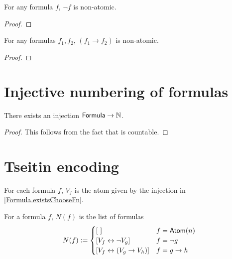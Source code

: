 \begin{lemma}
    \label{NonAtomic.neg}
    \leanok
    For any formula $f$, $\neg f$ is non-atomic.
\end{lemma}
\begin{proof}
    \leanok
\end{proof}

\begin{lemma}
    \label{NonAtomic.imp}
    \leanok
    For any formulas $f_1, f_2$, $(f_1 \to f_2)$ is non-atomic.
\end{lemma}
\begin{proof}
    \leanok
\end{proof}

\section{Injective numbering of formulas}

\begin{lemma}
    \label{Formula.existsChooseFn}
    \leanok
    There exists an injection $\mathsf{Formula} \to \mathbb{N}$.
\end{lemma}
\begin{proof}
    \leanok
    This follows from the fact that \Formula{} is countable.
\end{proof}

\section{Tseitin encoding}

\begin{definition}
    \label{V}
    \leanok
    For each formula $f$, $V_f$ is the atom given by the injection in \ref{Formula.existsChooseFn}.
\end{definition}

\begin{definition}
    \label{N}
    \leanok
    For a formula $f$, $N(f)$ is the list of formulas
    \[
    N(f) := \begin{cases}
        [\ ] & f = \mathsf{Atom}(n) \\
        \left[ V_f \leftrightarrow \neg V_g \right] & f = \neg g \\
        \left[ V_f \leftrightarrow (V_g \to V_h) \right] & f = g \to h
    \end{cases}
    \]
\end{definition}

